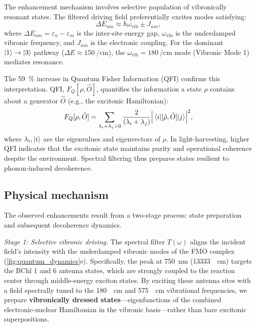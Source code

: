 \documentclass[journal=jpcl,manuscript=letter]{achemso}
\begin{document}
The enhancement mechanism involves selective population of vibronically resonant states. The filtered driving field preferentially excites modes satisfying:
\begin{equation}
\Delta E_{nm} \approx \hbar\omega_{\mathrm{vib}} \pm J_{nm},
\label{eq:resonance_condition}
\end{equation}
where $\Delta E_{nm} = \varepsilon_n - \varepsilon_m$ is the inter-site energy gap, $\omega_{\mathrm{vib}}$ is the underdamped vibronic frequency, and $J_{nm}$ is the electronic coupling. For the dominant $\ket{1} \to \ket{3}$ pathway ($\Delta E \approx \SI{150}{\per\centi\meter}$), the $\omega_{\mathrm{vib}} = \SI{180}{\per\centi\meter}$ mode (Vibronic Mode 1) mediates resonance.\cite{Chin2013,Fleming2015,Scholes2015}

The \SI{59}{\percent} increase in Quantum Fisher Information (QFI) confirms this interpretation. QFI, $F_Q[\rho, \hat{O}]$, quantifies the information a state $\rho$ contains about a generator $\hat{O}$ (e.g., the excitonic Hamiltonian):
\begin{equation}
F_Q[\rho, \hat{O}] = \sum_{\lambda_i + \lambda_j > 0} \frac{2}{(\lambda_i + \lambda_j)} \abs{\mel{i}{[\hat{\rho}, \hat{O}]}{j}}^2,
\label{eq:QFI}
\end{equation}
where $\lambda_i, \ket{i}$ are the eigenvalues and eigenvectors of $\rho$. In light-harvesting, higher QFI indicates that the excitonic state maintains purity and operational coherence despite the environment.\cite{Pezze2009} Spectral filtering thus prepares states resilient to phonon-induced decoherence.

\subsection*{Physical mechanism}

The observed enhancements result from a two-stage process: state preparation and subsequent decoherence dynamics. 

\textit{Stage 1: Selective vibronic driving.} The spectral filter $T(\omega)$ aligns the incident field's intensity with the underdamped vibronic modes of the FMO complex (\cref{fig:quantum_dynamics}e). Specifically, the peak at \SI{750}{\nano\meter} (\SI{13333}{\per\centi\meter}) targets the BChl 1 and 6 antenna states, which are strongly coupled to the reaction center through middle-energy exciton states. By exciting these antenna sites with a field spectrally tuned to the \SI{180}{\per\centi\meter} and \SI{575}{\per\centi\meter} vibrational frequencies, we prepare \textbf{vibronically dressed states}---eigenfunctions of the combined electronic-nuclear Hamiltonian in the vibronic basis\cite{Womick2015,Sanda2022}---rather than bare excitonic superpositions.
\end{document}
